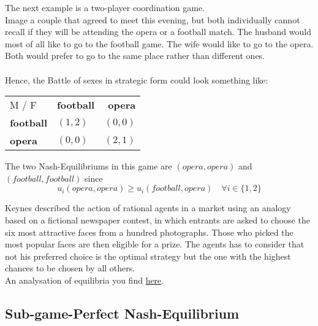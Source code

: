 \begin{example} \label{battleofthesexes} 
		The next example is a two-player coordination game. \\
		Image a couple that agreed to meet this evening, but both individually cannot recall if they will be attending the opera or a football match. The husband would most of all like to go to the football game. The wife would like to go to the opera. Both would prefer to go to the same place rather than different ones. \\ \\
		Hence, the Battle of sexes in strategic form could look something like:
		
		\begin{center}
			\begin{tabular}{|l|l|r|}
				\hline\hline
  					M / F & \textbf{football} & \textbf{opera} \\
         				\cline{1-3}
   					\textbf{football} & $(1, 2)$ & $(0, 0)$ 	\arrayrulewidth2pt \\
            			\cline{1-3}
   					\textbf{opera} & $(0, 0)$ & $(2, 1)$ \\ \hline\hline
			\end{tabular}	
		\end{center}
		
		The two Nash-Equilibriums in this game are $(opera, opera)$ and $(football, football)$ since
		\[ u_{i}(opera, opera) \geq u_{i}(football, opera) \quad \forall i \in \{ 1, 2 \} \]
\end{example}

\begin{example}  \label{Beauty-Contest}
Keynes described the action of rational agents in a market using an analogy based on a fictional newspaper contest, in which entrants are asked to choose the six most attractive faces from a hundred photographs. Those who picked the most popular faces are then eligible for a prize. The agents has to consider that not his preferred choice is the optimal strategy but the one with the highest chances to be chosen by all others. \\
	An analysation of equilibria you find \hyperref[Guessing-Game]{here}.
\end{example}

\subsection{Sub-game-Perfect Nash-Equilibrium}


